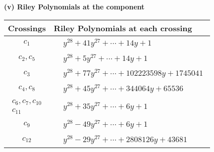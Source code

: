 \documentclass[1p]{elsarticle_modified}
\theoremstyle{definition}
\begin{document}
\newpage\renewcommand{\arraystretch}{1}
\flushleft \textbf{(v) Riley Polynomials at the component}\newline \\
\begin{tabular}{m{50pt}|m{274pt}}
Crossings & \hspace{64pt}Riley Polynomials at each crossing \\
\hline $$\begin{aligned}c_{1}\end{aligned}$$&$\begin{aligned}
&y^{28}+41 y^{27}+\cdots+14 y+1
\end{aligned}$\\
\hline $$\begin{aligned}c_{2},c_{5}\end{aligned}$$&$\begin{aligned}
&y^{28}+5 y^{27}+\cdots+14 y+1
\end{aligned}$\\
\hline $$\begin{aligned}c_{3}\end{aligned}$$&$\begin{aligned}
&y^{28}+77 y^{27}+\cdots+102223598 y+1745041
\end{aligned}$\\
\hline $$\begin{aligned}c_{4},c_{8}\end{aligned}$$&$\begin{aligned}
&y^{28}+45 y^{27}+\cdots+344064 y+65536
\end{aligned}$\\
\hline $$\begin{aligned}c_{6},c_{7},c_{10}\\c_{11}\end{aligned}$$&$\begin{aligned}
&y^{28}+35 y^{27}+\cdots+6 y+1
\end{aligned}$\\
\hline $$\begin{aligned}c_{9}\end{aligned}$$&$\begin{aligned}
&y^{28}-49 y^{27}+\cdots+6 y+1
\end{aligned}$\\
\hline $$\begin{aligned}c_{12}\end{aligned}$$&$\begin{aligned}
&y^{28}-29 y^{27}+\cdots+2808126 y+43681
\end{aligned}$\\
\hline
\end{tabular}\\~\\
\end{document}
